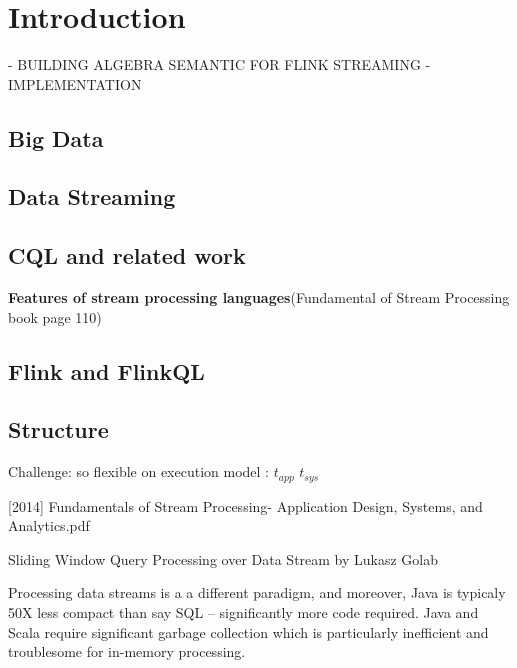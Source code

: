 
\chapter{Introduction}

\ifpdf
    \graphicspath{{Chapter1/Figs/Raster/}{Chapter1/Figs/PDF/}{Chapter1/Figs/}}
\else
    \graphicspath{{Chapter1/Figs/Vector/}{Chapter1/Figs/}}
\fi

- BUILDING ALGEBRA SEMANTIC FOR FLINK STREAMING
- IMPLEMENTATION
\section*{Big Data}
\section*{Data Streaming}
\section*{CQL and related work}
\textbf{Features of stream processing languages}(Fundamental of Stream Processing book page 110)


\section*{Flink and FlinkQL}
\section*{Structure}

Challenge: so flexible on execution model : $t_{app}$ $t_{sys}$



[2014] Fundamentals of Stream Processing- Application Design, Systems, and Analytics.pdf \citep{Henrique:2014}



Sliding Window Query Processing over Data Stream 
by
Lukasz Golab




 Processing data streams is a a different paradigm, and moreover, Java is typicaly 50X less compact than say SQL – significantly more code required. Java and Scala require significant garbage collection which is particularly inefficient and troublesome for in-memory processing.
 
 
 
 \href {http://www.sqlstream.com/blog/2015/03/5-reasons-why-spark-streamings-batch-processing-of-data-streams-is-not-stream-processing/}{}


